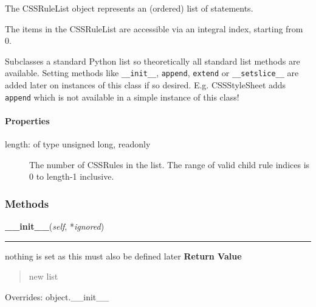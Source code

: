 The CSSRuleList object represents an (ordered) list of statements.

The items in the CSSRuleList are accessible via an integral index,
starting from 0.

Subclasses a standard Python list so theoretically all standard list
methods are available. Setting methods like \texttt{{\_}{\_}init{\_}{\_}}, \texttt{append},
\texttt{extend} or \texttt{{\_}{\_}setslice{\_}{\_}} are added later on instances of this
class if so desired.
E.g. CSSStyleSheet adds \texttt{append} which is not available in a simple
instance of this class!



\hypertarget{properties}{}
\paragraph*{Properties}
\label{properties}
\begin{description}
\item[{length: of type unsigned long, readonly}] \leavevmode 
The number of CSSRules in the list. The range of valid child rule
indices is 0 to length-1 inclusive.

\end{description}


  \subsubsection{Methods}

    \vspace{0.5ex}

\hspace{.8\funcindent}\begin{boxedminipage}{\funcwidth}

    \raggedright \textbf{\_\_init\_\_}(\textit{self}, *\textit{ignored})

    \vspace{-1.5ex}

    \rule{\textwidth}{0.5\fboxrule}
\setlength{\parskip}{2ex}

nothing is set as this must also be defined later
\setlength{\parskip}{1ex}
      \textbf{Return Value}
    \vspace{-1ex}

      \begin{quote}
      new list

      \end{quote}

      Overrides: object.\_\_init\_\_

    \end{boxedminipage}

